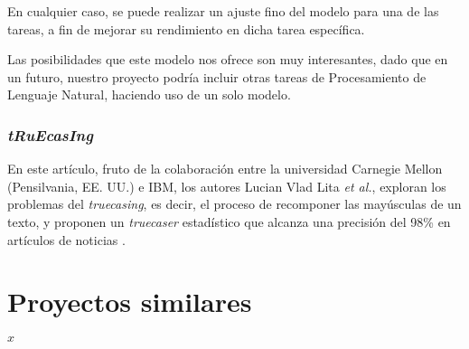 \bigskip


En cualquier caso, se puede realizar un ajuste fino del modelo para una de las tareas, a fin de mejorar su rendimiento en dicha tarea específica.

Las posibilidades que este modelo nos ofrece son muy interesantes, dado que en un futuro, nuestro proyecto podría incluir otras tareas de Procesamiento de Lenguaje Natural, haciendo uso de un solo modelo.

\bigskip
\subsubsection{\emph{tRuEcasIng}}

En este artículo, fruto de la colaboración entre la universidad Carnegie Mellon (Pensilvania, EE. UU.) e IBM, los autores Lucian Vlad Lita \emph{et al.}, exploran los problemas del \emph{truecasing}, es decir, el proceso de recomponer las mayúsculas de un texto, y proponen un \emph{truecaser} estadístico que alcanza una precisión del 98\% en artículos de noticias \cite{lita03}.


\section{Proyectos similares}

$x$

